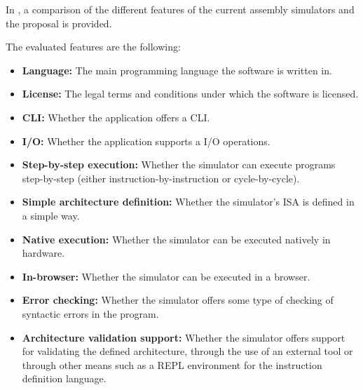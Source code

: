 In , a comparison of the different features of the current assembly simulators and the proposal is provided.

The evaluated features are the following:
\begin{itemize}
  \item \textbf{Language:} The main \gls{programming language} the software is written in.
  \item \textbf{License:} The legal terms and conditions under which the software is licensed.
  \item \textbf{\gls{CLI}:} Whether the application offers a \gls{CLI}.
  \item \textbf{\gls{I/O}:} Whether the application supports a \gls{I/O} operations.
  \item \textbf{Step-by-step execution:} Whether the simulator can execute programs step-by-step (either instruction-by-instruction or cycle-by-cycle).
  \item \textbf{Simple architecture definition:} Whether the simulator's \gls{ISA} is defined in a simple way.
  \item \textbf{Native execution:} Whether the simulator can be executed natively in hardware.
  \item \textbf{In-browser:} Whether the simulator can be executed in a browser.
  \item \textbf{Error checking:} Whether the simulator offers some type of checking of syntactic errors in the program.
  \item \textbf{Architecture validation support:} Whether the simulator offers support for validating the defined architecture, through the use of an external tool or through other means such as a \gls{REPL environment} for the instruction definition language.
\end{itemize}

